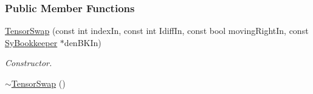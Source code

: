 \subsubsection*{Public Member Functions}
\begin{DoxyCompactItemize}
\item 
\hyperlink{classCheMPS2_1_1TensorSwap_a766c00b77a2a68696079e943b1bfae39}{Tensor\-Swap} (const int index\-In, const int Idiff\-In, const bool moving\-Right\-In, const \hyperlink{classCheMPS2_1_1SyBookkeeper}{Sy\-Bookkeeper} $\ast$den\-B\-K\-In)
\begin{DoxyCompactList}\small\item\em Constructor. \end{DoxyCompactList}\item 
\hypertarget{classCheMPS2_1_1TensorSwap_ad8dc760a6a31d897c3804c1d56e47584}{\hyperlink{classCheMPS2_1_1TensorSwap_ad8dc760a6a31d897c3804c1d56e47584}{$\sim$\-Tensor\-Swap} ()}\label{classCheMPS2_1_1TensorSwap_ad8dc760a6a31d897c3804c1d56e47584}


\end{DoxyCompactItemize}
